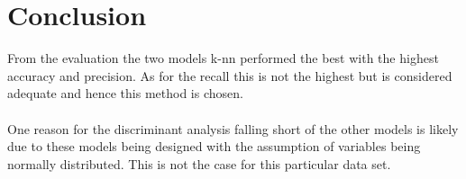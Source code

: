 \section{Conclusion}

From the evaluation the two models k-nn performed the best with the highest accuracy and precision. 
As for the recall this is not the highest but is considered adequate and hence this method is chosen.
\\
\\
One reason for the discriminant analysis falling short of the other models is likely due to these models
being designed with the assumption of variables being normally distributed.
This is not the case for this particular data set.
